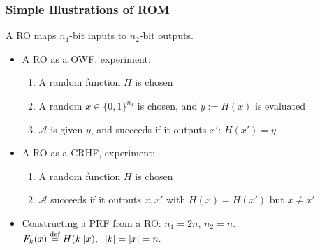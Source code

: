 \begin{frame}\frametitle{Simple Illustrations of ROM}
A RO maps $n_1$-bit inputs to $n_2$-bit outputs.
\begin{itemize}
\item A RO as a OWF, experiment:
\begin{enumerate}
\item A random function $H$ is chosen
\item A random $x \in \{0,1\}^{n_1}$ is chosen, and $y := H(x)$ is evaluated
\item $\mathcal{A}$ is given $y$, and succeeds if it outputs $x'$: $H(x')=y$
\end{enumerate}
\item A RO as a CRHF, experiment:
\begin{enumerate}
\item A random function $H$ is chosen
\item $\mathcal{A}$ succeeds if it outputs $x, x'$ with $H(x)=H(x')$ but $x\neq x'$
\end{enumerate}
\item Constructing a PRF from a RO: $n_1=2n$, $n_2=n$.
$ F_k(x) \overset{\text{def}}{=} H(k\| x),\;\; \lvert k\rvert=\lvert x\rvert=n.$
\end{itemize}
\end{frame}
